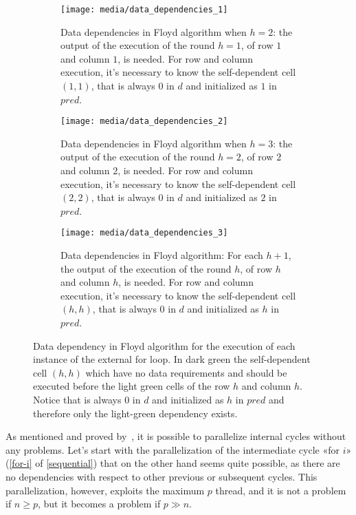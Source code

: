 \begin{figure}[htbp]
    \centering
    \begin{subfigure}[t]{0.3\textwidth}
        \centering
        \texttt{[image: media/data\_dependencies\_1]}
        \caption{Data dependencies in Floyd algorithm when \(h=2\): the output of the execution of the round \(h=1\), of row \(1\) and column \(1\), is needed. For row and column execution, it's necessary to know the self-dependent cell \((1,1)\), that is always \(0\) in \(d\) and initialized as \(1\) in \(pred\).}
        \label{data-dependencies-1}
    \end{subfigure}
    \hfill
    \begin{subfigure}[t]{0.3\textwidth}
        \centering
        \texttt{[image: media/data\_dependencies\_2]}
        \caption{Data dependencies in Floyd algorithm when \(h=3\): the output of the execution of the round \(h=2\), of row \(2\) and column \(2\), is needed. For row and column execution, it's necessary to know the self-dependent cell \((2,2)\), that is always \(0\) in \(d\) and initialized as \(2\) in \(pred\).}
        \label{data-dependencies-2}
    \end{subfigure}
    \hfill
    \begin{subfigure}[t]{0.3\textwidth}
        \centering
        \texttt{[image: media/data\_dependencies\_3]}
        \caption{Data dependencies in Floyd algorithm: For each \(h+1\), the output of the execution of the round \(h\), of row \(h\) and column \(h\), is needed. For row and column execution, it's necessary to know the self-dependent cell \((h,h)\), that is always \(0\) in \(d\) and initialized as \(h\) in \(pred\).}
        \label{data-dependencies-3}
    \end{subfigure}
    \caption{Data dependency in Floyd algorithm for the execution of each instance of the external for loop. In dark green the self-dependent cell \((h,h)\) which have no data requirements and should be executed before the light green cells of the row \(h\) and column \(h\). Notice that is always \(0\) in \(d\) and initialized as \(h\) in \(pred\) and therefore only the light-green dependency exists.}
    \label{data-dependency-external-loop}
\end{figure}

As mentioned and proved by~\cite{rucci}, it is possible to parallelize internal cycles without any problems. 
Let's start with the parallelization of  the intermediate cycle «for \(i\)» (\cref{for-i} of \cref{sequential}) that on the other hand seems quite possible, as there are no dependencies with respect to other previous or subsequent cycles.
This parallelization, however, exploits the maximum \(p\) thread, and it is not a problem if \(n \geq p\), but it becomes a problem if \(p \gg n\).

